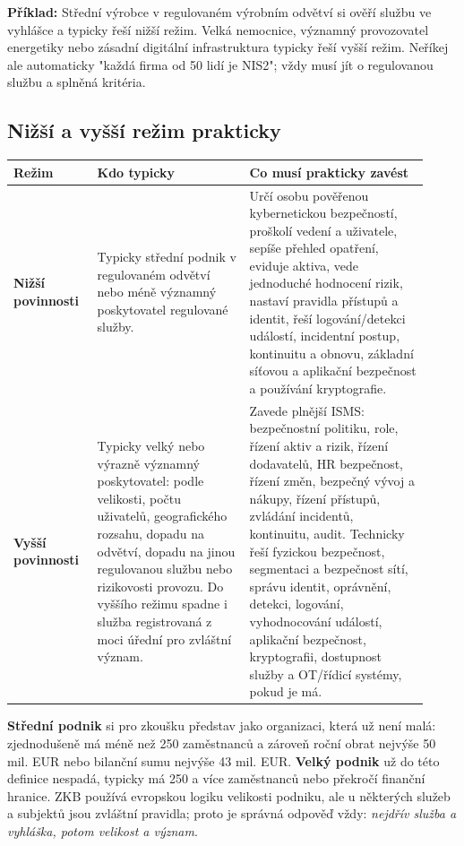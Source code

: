 \documentclass[11pt,a4paper]{article}
\newcommand{\priklad}[1]{\begin{tcolorbox}[breakable,enhanced,colback=green!7,colframe=green!30!black,boxrule=0pt,arc=1mm,left=5pt,right=5pt,top=5pt,bottom=5pt,before skip=6pt,after skip=6pt]\textbf{Příklad:} #1\end{tcolorbox}}
\begin{document}
\priklad{Střední výrobce v regulovaném výrobním odvětví si ověří službu ve vyhlášce a typicky řeší nižší režim. Velká nemocnice, významný provozovatel energetiky nebo zásadní digitální infrastruktura typicky řeší vyšší režim. Neříkej ale automaticky "každá firma od 50 lidí je NIS2"; vždy musí jít o regulovanou službu a splněná kritéria.}

\subsection*{Nižší a vyšší režim prakticky}
\begin{longtable}{p{0.18\linewidth}p{0.34\linewidth}p{0.40\linewidth}}
\toprule
\textbf{Režim} & \textbf{Kdo typicky} & \textbf{Co musí prakticky zavést}\\
\midrule
\textbf{Nižší povinnosti} &
Typicky střední podnik v regulovaném odvětví nebo méně významný poskytovatel regulované služby. &
Určí osobu pověřenou kybernetickou bezpečností, proškolí vedení a uživatele, sepíše přehled opatření, eviduje aktiva, vede jednoduché hodnocení rizik, nastaví pravidla přístupů a identit, řeší logování/detekci událostí, incidentní postup, kontinuitu a obnovu, základní síťovou a aplikační bezpečnost a používání kryptografie.\\
\addlinespace
\textbf{Vyšší povinnosti} &
Typicky velký nebo výrazně významný poskytovatel: podle velikosti, počtu uživatelů, geografického rozsahu, dopadu na odvětví, dopadu na jinou regulovanou službu nebo rizikovosti provozu. Do vyššího režimu spadne i služba registrovaná z moci úřední pro zvláštní význam. &
Zavede plnější ISMS: bezpečnostní politiku, role, řízení aktiv a rizik, řízení dodavatelů, HR bezpečnost, řízení změn, bezpečný vývoj a nákupy, řízení přístupů, zvládání incidentů, kontinuitu, audit. Technicky řeší fyzickou bezpečnost, segmentaci a bezpečnost sítí, správu identit, oprávnění, detekci, logování, vyhodnocování událostí, aplikační bezpečnost, kryptografii, dostupnost služby a OT/řídicí systémy, pokud je má.\\
\bottomrule
\end{longtable}

\textbf{Střední podnik} si pro zkoušku představ jako organizaci, která už není malá: zjednodušeně má méně než 250 zaměstnanců a zároveň roční obrat nejvýše 50 mil. EUR nebo bilanční sumu nejvýše 43 mil. EUR. \textbf{Velký podnik} už do této definice nespadá, typicky má 250 a více zaměstnanců nebo překročí finanční hranice. ZKB používá evropskou logiku velikosti podniku, ale u některých služeb a subjektů jsou zvláštní pravidla; proto je správná odpověď vždy: \emph{nejdřív služba a vyhláška, potom velikost a význam}.
\end{document}
